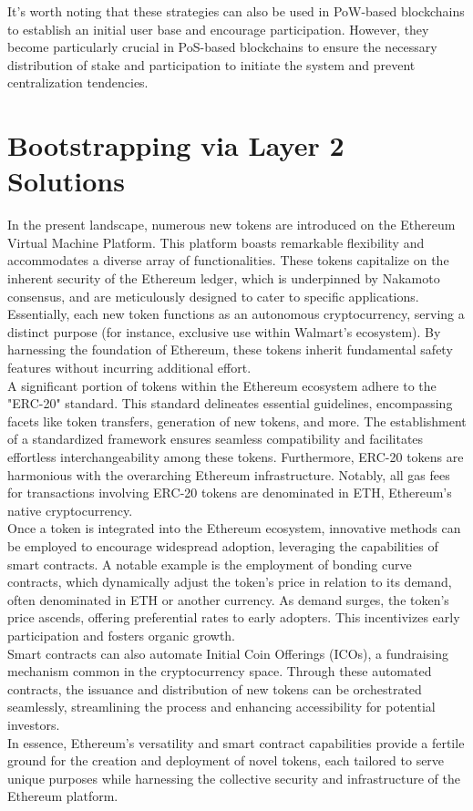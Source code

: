 It's worth noting that these strategies can also be used in PoW-based blockchains to establish an initial user base and encourage participation. However, they become particularly crucial in PoS-based blockchains to ensure the necessary distribution of stake and participation to initiate the system and prevent centralization tendencies.
\section{Bootstrapping via Layer 2 Solutions}
In the present landscape, numerous new tokens are introduced on the Ethereum Virtual Machine Platform. This platform boasts remarkable flexibility and accommodates a diverse array of functionalities. These tokens capitalize on the inherent security of the Ethereum ledger, which is underpinned by Nakamoto consensus, and are meticulously designed to cater to specific applications. Essentially, each new token functions as an autonomous cryptocurrency, serving a distinct purpose (for instance, exclusive use within Walmart's ecosystem). By harnessing the foundation of Ethereum, these tokens inherit fundamental safety features without incurring additional effort.\\
A significant portion of tokens within the Ethereum ecosystem adhere to the "ERC-20" standard. This standard delineates essential guidelines, encompassing facets like token transfers, generation of new tokens, and more. The establishment of a standardized framework ensures seamless compatibility and facilitates effortless interchangeability among these tokens. Furthermore, ERC-20 tokens are harmonious with the overarching Ethereum infrastructure. Notably, all gas fees for transactions involving ERC-20 tokens are denominated in ETH, Ethereum's native cryptocurrency.\\
Once a token is integrated into the Ethereum ecosystem, innovative methods can be employed to encourage widespread adoption, leveraging the capabilities of smart contracts. A notable example is the employment of bonding curve contracts, which dynamically adjust the token's price in relation to its demand, often denominated in ETH or another currency. As demand surges, the token's price ascends, offering preferential rates to early adopters. This incentivizes early participation and fosters organic growth.\\
Smart contracts can also automate Initial Coin Offerings (ICOs), a fundraising mechanism common in the cryptocurrency space. Through these automated contracts, the issuance and distribution of new tokens can be orchestrated seamlessly, streamlining the process and enhancing accessibility for potential investors.\\
In essence, Ethereum's versatility and smart contract capabilities provide a fertile ground for the creation and deployment of novel tokens, each tailored to serve unique purposes while harnessing the collective security and infrastructure of the Ethereum platform.